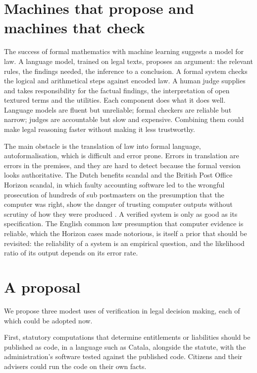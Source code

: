 \section{Machines that propose and machines that check}

The success of formal mathematics with machine learning suggests a model for law. A language model, trained on legal texts, proposes an argument: the relevant rules, the findings needed, the inference to a conclusion. A formal system checks the logical and arithmetical steps against encoded law. A human judge supplies and takes responsibility for the factual findings, the interpretation of open textured terms and the utilities. Each component does what it does well. Language models are fluent but unreliable; formal checkers are reliable but narrow; judges are accountable but slow and expensive. Combining them could make legal reasoning faster without making it less trustworthy.

The main obstacle is the translation of law into formal language, autoformalisation, which is difficult and error prone. Errors in translation are errors in the premises, and they are hard to detect because the formal version looks authoritative. The Dutch benefits scandal and the British Post Office Horizon scandal, in which faulty accounting software led to the wrongful prosecution of hundreds of sub postmasters on the presumption that the computer was right, show the danger of trusting computer outputs without scrutiny of how they were produced \citep{bates2019,hamilton2021}. A verified system is only as good as its specification. The English common law presumption that computer evidence is reliable, which the Horizon cases made notorious, is itself a prior that should be revisited: the reliability of a system is an empirical question, and the likelihood ratio of its output depends on its error rate.

\section{A proposal}

We propose three modest uses of verification in legal decision making, each of which could be adopted now.

First, statutory computations that determine entitlements or liabilities should be published as code, in a language such as Catala, alongside the statute, with the administration's software tested against the published code. Citizens and their advisers could run the code on their own facts.

